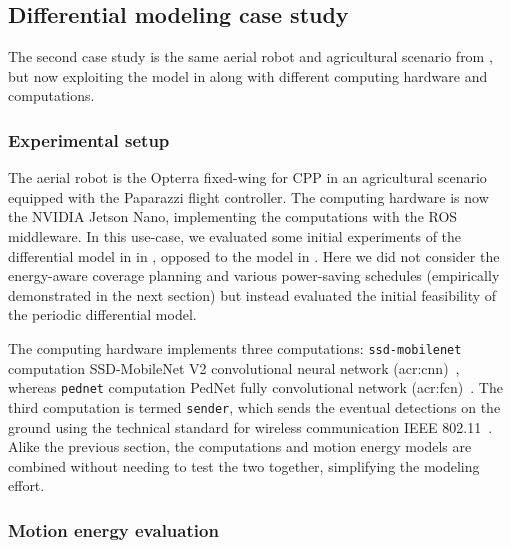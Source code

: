 \subsection{Differential modeling case study}
\label{sec:res-diff}

The second case study is the same aerial robot and agricultural scenario from , but now exploiting the model in  along with different computing hardware and computations.

\subsubsection*{Experimental setup}

The aerial robot is the Opterra fixed-wing for CPP in an agricultural scenario equipped with the Paparazzi flight controller. The computing hardware is now the NVIDIA Jetson Nano, implementing the computations with the ROS middleware. In this use-case, we evaluated some initial experiments of the differential model in  in , opposed to the model in . Here we did not consider the energy-aware coverage planning and various power-saving schedules (empirically demonstrated in the next section) but instead evaluated the initial feasibility of the periodic differential model.

The computing hardware implements three computations: {\small\tt ssd-mobilenet} computation SSD-MobileNet V2 convolutional neural network (\Gls{acr:cnn})~\citep{sandler2018mobilenetv2}, whereas {\small\tt pednet} computation PedNet fully convolutional network (\Gls{acr:fcn})~\citep{ullah2018pednet}. The third computation is termed {\small\tt sender}, which sends the eventual detections on the ground using the technical standard for wireless communication IEEE 802.11~\citep{crow1997ieee}. Alike the previous section, the computations and motion energy models are combined without needing to test the two together, simplifying the modeling effort. 

\subsubsection*{Motion energy evaluation}

